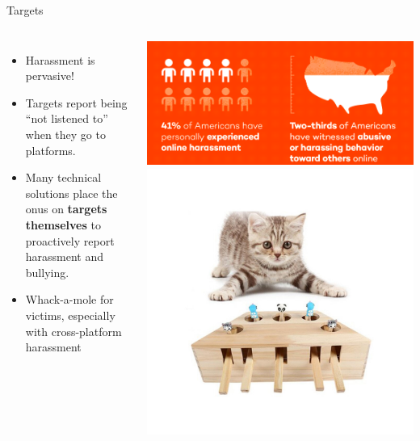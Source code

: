 \documentclass[nobackground,dvipsnames,table]{beamer}
\begin{document}
\begin{frame}{Targets}
    \begin{columns}
            \begin{itemize}
                \item Harassment is pervasive!
                \item Targets report being “not listened to” when they go to platforms.
                \item Many technical solutions place the onus on \textbf{targets themselves} to proactively report harassment and bullying.
                \item Whack-a-mole for victims, especially with cross-platform harassment 
            \end{itemize}
            \centering
            \includegraphics[width=\textwidth]{harassment-stats}
            \includegraphics[width=\textwidth]{whack-a-mole-kitten}
    \end{columns}
\end{frame}
\end{document}
